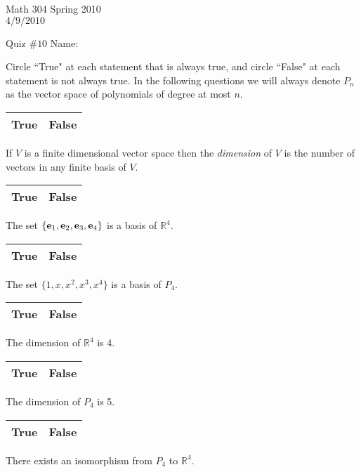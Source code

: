 \documentclass[10pt]{exam}
\begin{document}
Math 304 Spring 2010 \\
$4/9/2010$

Quiz $\#10$ \hspace{1.9in} {Name:} {\underline {\hspace{2.5in}}}
\vspace{.5pc}

\begin{center}
\end{center}

\begin{questions}


\question Circle ``True" at each statement that is always true, and circle ``False" at each
statement is not always true.  In the following questions we will always denote $P_n$ as the vector space of polynomials of degree at most $n$.
\begin{choices}
\choice \begin{tabular}{|c|c|}\hline True & False \\ \hline \end{tabular} If $V$ is a finite dimensional vector space then the {\it dimension} of $V$ is the number of vectors in any finite basis of $V$.
\choice \begin{tabular}{|c|c|}\hline True & False \\ \hline \end{tabular} The set $\{{\bf e}_1,{\bf e}_2,{\bf e}_3,{\bf e}_4 \}$ is a basis of $\mathbb{R}^4$.
\choice \begin{tabular}{|c|c|}\hline True & False \\ \hline \end{tabular} The set $\{1,x,x^2,x^3,x^4 \}$ is a basis of $P_4$.
\choice \begin{tabular}{|c|c|}\hline True & False \\ \hline \end{tabular} The dimension of  $\mathbb{R}^4$ is 4.
\choice \begin{tabular}{|c|c|}\hline True & False \\ \hline \end{tabular} The dimension of  $P_4$ is 5.
\choice \begin{tabular}{|c|c|}\hline True & False \\ \hline \end{tabular} There exists an isomorphism from $P_4$ to $\mathbb{R}^4$.

\end{choices}
\end{questions}
\end{document}
